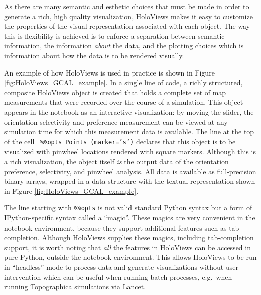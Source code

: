 \documentclass[phd,ianc,twoside]{infthesis}
\begin{document}
As there are many semantic and esthetic choices that must be made in
order to generate a rich, high quality visualization, HoloViews makes it
easy to customize the properties of the visual representation associated
with each object. The way this is flexibility is achieved is to enforce
a separation between semantic information, the information \emph{about}
the data, and the plotting choices which is information about how the
data is to be rendered visually.


An example of how HoloViews is used in practice is shown in Figure
\ref{fig:HoloViews_GCAL_example}. In a single line of code, a richly
structured, composite HoloViews object is created that holds a complete
set of map measurements that were recorded over the course of a
simulation. This object appears in the notebook as an interactive
visualization: by moving the slider, the orientation selectivity and
preference measurement can be viewed at any simulation time for which
this measurement data is available. The line at the top of the cell {\tt
  \%\%opts Points (marker='s')} declares that this object is to be
visualized with pinwheel locations rendered with square
markers. Although this is a rich visualization, the object itself
\emph{is} the output data of the orientation preference, selectivity, and
pinwheel analysis. All data is available as full-precision binary arrays,
wrapped in a data structure with the textual representation shown in
Figure \ref{fig:HoloViews_GCAL_example}.

The line starting with {\tt \%\%opts} is not valid standard Python syntax but a
form of IPython-specific syntax called a ``magic''. These magics are
very convenient in the notebook environment, because they support additional
features such as tab-completion. Although HoloViews supplies these
magics, including tab-completion support, it is worth noting that
\emph{all} the features in HoloViews can be accessed in pure Python,
outside the notebook environment. This allows HoloViews to be run in
``headless'' mode to process data and generate visualizations without user
intervention which can be useful when running batch processes, e.g.\
when running Topographica simulations via Lancet.
\end{document}
